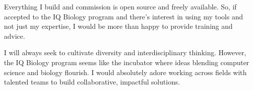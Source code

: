 \documentclass[12pt]{article}
\begin{document}
Everything I build and commission is open source and freely available. So, if accepted to the IQ Biology program and there's interest in using my tools and not just my expertise, I would be more than happy to provide training and advice.

I will always seek to cultivate diversity and interdisciplinary thinking. However, the IQ Biology program seems like the incubator where ideas blending computer science and biology flourish. I would absolutely adore working across fields with talented teams to build collaborative, impactful solutions.
\end{document}
